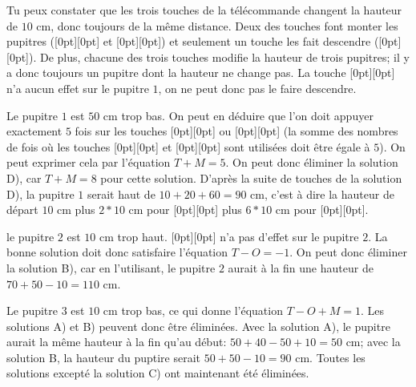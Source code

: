 \documentclass[a4paper,11pt]{report}
\newcommand{\taskGraphicsFolder}{..}
\begin{document}
Tu peux constater que les trois touches de la télécommande changent la hauteur de $10$ cm, donc toujours de la même distance. Deux des touches font monter les pupitres (\raisebox{-0.5ex}[0pt][0pt]{} et \raisebox{-0.5ex}[0pt][0pt]{}) et seulement un touche les fait descendre (\raisebox{-0.5ex}[0pt][0pt]{}). De plus, chacune des trois touches modifie la hauteur de trois pupitres; il y a donc toujours un pupitre dont la hauteur ne change pas. La touche \raisebox{-0.5ex}[0pt][0pt]{} n’a aucun effet sur le pupitre $1$, on ne peut donc pas le faire descendre.

Le pupitre $1$ est $50$ cm trop bas. On peut en déduire que l’on doit appuyer exactement $5$ fois sur les touches \raisebox{-0.5ex}[0pt][0pt]{} ou \raisebox{-0.5ex}[0pt][0pt]{} (la somme des nombres de fois où les touches \raisebox{-0.5ex}[0pt][0pt]{} et \raisebox{-0.5ex}[0pt][0pt]{} sont utilisées doit être égale à $5$). On peut exprimer cela par l’équation ${T + M = 5}$. On peut donc éliminer la solution D), car ${T + M = 8}$ pour cette solution. D’après la suite de touches de la solution D), la pupitre $1$ serait haut de ${10 + 20 + 60 = 90}$ cm, c’est à dire la hauteur de départ ${10}$ cm plus ${2 \ast 10}$ cm pour \raisebox{-0.5ex}[0pt][0pt]{} plus ${6 \ast 10}$ cm pour \raisebox{-0.5ex}[0pt][0pt]{}.

le pupitre $2$ est $10$ cm trop haut. \raisebox{-0.5ex}[0pt][0pt]{} n’a pas d’effet sur le pupitre $2$. La bonne solution doit donc satisfaire l’équation ${T - O = -1}$. On peut donc éliminer la solution B), car en l’utilisant, le pupitre $2$ aurait à la fin une hauteur de ${70 + 50 - 10 = 110}$ cm.

Le pupitre $3$ est $10$ cm trop bas, ce qui donne l’équation ${T - O + M = 1}$. Les solutions A) et B) peuvent donc être éliminées. Avec la solution A), le pupitre aurait la même hauteur à la fin qu’au début: ${50 + 40 - 50 + 10 = 50}$ cm; avec la solution B, la hauteur du puptire serait ${50 + 50 - 10 = 90}$ cm. Toutes les solutions excepté la solution C) ont maintenant été éliminées.
\end{document}
